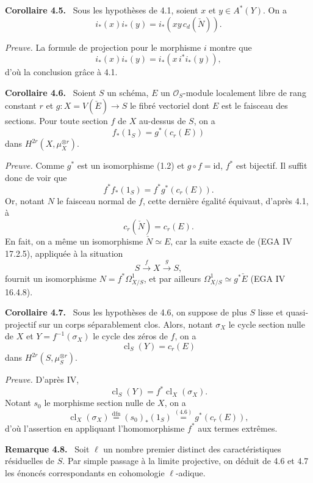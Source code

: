 \documentclass[11pt]{article}
\newenvironment{statement}[1]{\par\medskip\noindent\textbf{#1.}\ }{\par\medskip}
\providecommand{\cl}{\operatorname{cl}}
\providecommand{\cl}{\operatorname{cl}}
\providecommand{\cl}{\operatorname{cl}}
\begin{document}
\begin{statement}{Corollaire 4.5}
Sous les hypothèses de 4.1, soient $x$ et $y\in A^*(Y)$. On a
\[
i_*(x)i_*(y)=i_*(xy\,c_d(\check N)).
\]
\end{statement}

\emph{Preuve.} La formule de projection pour le morphisme $i$ montre que
\[
i_*(x)i_*(y)=i_*(x\,i^*i_*(y)),
\]
d'où la conclusion grâce à 4.1.

\begin{statement}{Corollaire 4.6}
Soient $S$ un schéma, $E$ un $\mathcal O_S$-module localement libre de rang constant $r$ et $g:X=V(\check E)\to S$ le fibré vectoriel dont $E$ est le faisceau des sections. Pour toute section $f$ de $X$ au-dessus de $S$, on a
\[
f_*(1_S)=g^*(c_r(E))
\]
dans $H^{2r}(X,\mu_X^{\otimes r})$.
\end{statement}

\emph{Preuve.} Comme $g^*$ est un isomorphisme (1.2) et $g\circ f=\mathrm{id}$, $f^*$ est bijectif. Il suffit donc de voir que
\[
f^*f_*(1_S)=f^*g^*(c_r(E)).
\]
Or, notant $N$ le faisceau normal de $f$, cette dernière égalité équivaut, d'après 4.1, à
\[
c_r(\check N)=c_r(E).
\]
En fait, on a même un isomorphisme $\check N\simeq E$, car la suite exacte de (EGA IV 17.2.5), appliquée à la situation
\[
S\xrightarrow{f} X\xrightarrow{g} S,
\]
fournit un isomorphisme $N=f^*\Omega^1_{X/S}$, et par ailleurs $\Omega^1_{X/S}\simeq g^*\check E$ (EGA IV 16.4.8).

\begin{statement}{Corollaire 4.7}
Sous les hypothèses de 4.6, on suppose de plus $S$ lisse et quasi-projectif sur un corps séparablement clos. Alors, notant $\sigma_X$ le cycle section nulle de $X$ et $Y=f^{-1}(\sigma_X)$ le cycle des zéros de $f$, on a
\[
\cl_S(Y)=c_r(E)
\]
dans $H^{2r}(S,\mu_S^{\otimes r})$.
\end{statement}

\emph{Preuve.} D'après IV,
\[
\cl_S(Y)=f^*\cl_X(\sigma_X).
\]
Notant $s_0$ le morphisme section nulle de $X$, on a
\[
\cl_X(\sigma_X)\stackrel{\mathrm{dfn}}{=}(s_0)_*(1_S)\stackrel{(4.6)}{=}g^*(c_r(E)),
\]
d'où l'assertion en appliquant l'homomorphisme $f^*$ aux termes extrêmes.

\begin{statement}{Remarque 4.8}
Soit $\ell$ un nombre premier distinct des caractéristiques résiduelles de $S$. Par simple passage à la limite projective, on déduit de 4.6 et 4.7 les énoncés correspondants en cohomologie $\ell$-adique.
\end{statement}
\end{document}
